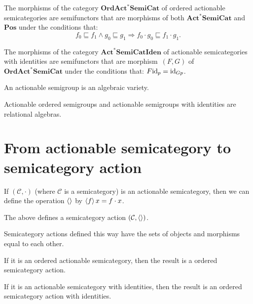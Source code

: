 \documentclass[a4paper,oneside,english,reqno]{amsart}
\begin{document}
\begin{defn}
The morphisms of the category $\mathbf{OrdAct^{\ast}SemiCat}$ of ordered actionable semicategories are semifunctors that are morphisms of both $\mathbf{Act^{\ast}SemiCat}$ and $\mathbf{Pos}$ under the conditions that:
\[
f_0\sqsubseteq f_1\land g_0\sqsubseteq g_1\Rightarrow f_0\cdot g_0\sqsubseteq f_1\cdot g_1.
\]
\end{defn}

\begin{defn}
The morphisms of the category $\mathbf{Act^{\ast}SemiCatIden}$ of actionable semicategories with identities are semifunctors that are morphism~$(F,G)$ of $\mathbf{OrdAct^{\ast}SemiCat}$ under the conditions that: $F{\operatorname{id}}_p={\operatorname{id}}_{Gp}$.
\end{defn}

\begin{obvious}
An actionable semigroup is an algebraic variety.
\end{obvious}

\begin{obvious}
Actionable ordered semigroups and actionable semigroups with identities are relational algebras.
\end{obvious}

\section{From actionable semicategory to semicategory action}

\begin{defn}
If $(\mathcal{C},\cdot)$ (where $\mathcal{C}$ is a semicategory) is an actionable semicategory, then we can define the operation $\left\langle \right\rangle$ by $\left\langle f\right\rangle x = f\cdot x$.
\end{defn}

\begin{obvious}
The above defines a semicategory action $(\mathcal{C},\left\langle \right\rangle)$.
\end{obvious}

\begin{rem}
Semicategory actions defined this way have the sets of objects and morphisms equal to each other.
\end{rem}

\begin{obvious}
If it is an ordered actionable semicategory, then the result is a ordered semicategory action.
\end{obvious}

\begin{obvious}
If it is an actionable semicategory with identities, then the result is an ordered semicategory action with identities.
\end{obvious}
\end{document}
